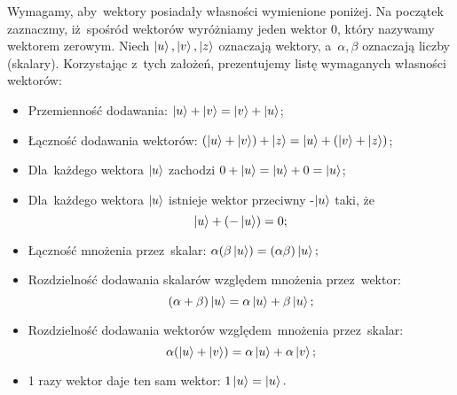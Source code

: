 Wymagamy, aby~wektory posiadały własności wymienione poniżej. Na początek
zaznaczmy, iż~spośród wektorów wyróżniamy jeden wektor $0$, który nazywamy
wektorem zerowym. Niech $\ket{u}, \ket{v}, \ket{z}$ oznaczają wektory,
a~$\alpha, \beta$ oznaczają liczby (skalary). Korzystając z~tych założeń,
prezentujemy listę wymaganych własności wektorów:
\begin{itemize}
	\item Przemienność dodawania:
	      $\ket{u}+\ket{v}=\ket{v}+\ket{u}$;

	\item Łączność dodawania wektorów:
	      $(\ket{u}+\ket{v})+\ket{z}=\ket{u}+(\ket{v}+\ket{z})$;

	\item Dla~każdego wektora $\ket{u}$ zachodzi
	      $0+\ket{u}=\ket{u}+0=\ket{u}$;

	\item Dla~każdego wektora $\ket{u}$ istnieje wektor przeciwny -$\ket{u}$ taki, że $$\ket{u}+(-\ket{u})=0;$$

	\item Łączność mnożenia przez~skalar:
	      $\alpha(\beta\ket{u})=(\alpha\beta)\ket{u};$

	\item Rozdzielność dodawania skalarów względem mnożenia przez~wektor:
	      $$(\alpha+\beta)\ket{u}=\alpha\ket{u}+\beta\ket{u};$$

	\item Rozdzielność dodawania wektorów względem~mnożenia przez~skalar:\\
	      $$\alpha(\ket{u}+\ket{v})=\alpha\ket{u}+\alpha\ket{v};$$

	\item 1 razy wektor daje ten sam wektor: $1\ket{u}=\ket{u}.$
\end{itemize}

